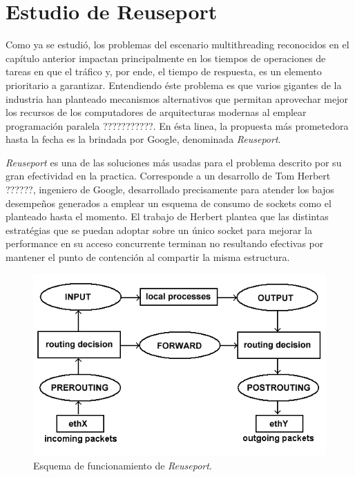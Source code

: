 \chapter{Estudio de Reuseport}

Como ya se estudió, los problemas del escenario multithreading reconocidos en el capítulo anterior impactan principalmente en los tiempos de operaciones de tareas en que el tráfico y, por ende, el tiempo de respuesta, es un elemento prioritario a garantizar. Entendiendo éste problema es que varios gigantes de la industria han planteado mecanismos alternativos que permitan aprovechar mejor los recursos de los computadores de arquitecturas modernas al emplear programación paralela ???????????. En ésta linea, la propuesta más prometedora hasta la fecha es la brindada por Google, denominada \emph{Reuseport}.

\emph{Reuseport} es una de las soluciones más usadas para el problema descrito por su gran efectividad en la practica. Corresponde a un desarrollo de Tom Herbert ??????, ingeniero de Google, desarrollado precisamente para atender los bajos desempeños generados a emplear un esquema de consumo de sockets como el planteado hasta el momento. El trabajo de Herbert plantea que las distintas estratégias que se puedan adoptar sobre un único socket para mejorar la performance en su acceso concurrente terminan no resultando efectivas por mantener el punto de contención al compartir la misma estructura.

\begin{figure}[!h]
	\centering
	\includegraphics[scale=.5]{imagenes/netfilterArchitecture}
	\caption{Esquema de funcionamiento de \emph{Reuseport}.}
	\label{netfilterArchitecture}
\end{figure}

